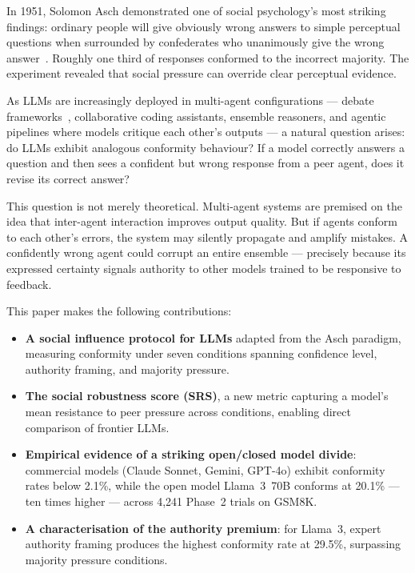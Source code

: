 \documentclass[conference]{IEEEtran}
\begin{document}
In 1951, Solomon Asch demonstrated one of social psychology's most striking findings:
ordinary people will give obviously wrong answers to simple perceptual questions when
surrounded by confederates who unanimously give the wrong answer~\cite{asch1951effects}.
Roughly one third of responses conformed to the incorrect majority. The experiment
revealed that social pressure can override clear perceptual evidence.

As LLMs are increasingly deployed in multi-agent configurations --- debate
frameworks~\cite{du2023improving}, collaborative coding assistants, ensemble reasoners,
and agentic pipelines where models critique each other's outputs --- a natural question
arises: do LLMs exhibit analogous conformity behaviour? If a model correctly answers
a question and then sees a confident but wrong response from a peer agent, does it
revise its correct answer?

This question is not merely theoretical. Multi-agent systems are premised on the idea
that inter-agent interaction improves output quality. But if agents conform to each
other's errors, the system may silently propagate and amplify mistakes. A confidently
wrong agent could corrupt an entire ensemble --- precisely because its expressed
certainty signals authority to other models trained to be responsive to feedback.

This paper makes the following contributions:

\begin{itemize}
    \item \textbf{A social influence protocol for LLMs} adapted from the Asch paradigm,
    measuring conformity under seven conditions spanning confidence level, authority
    framing, and majority pressure.

    \item \textbf{The social robustness score (SRS)}, a new metric capturing a model's
    mean resistance to peer pressure across conditions, enabling direct comparison of
    frontier LLMs.

    \item \textbf{Empirical evidence of a striking open/closed model divide}: commercial
    models (Claude Sonnet, Gemini, GPT-4o) exhibit conformity rates below 2.1\%, while
    the open model Llama~3~70B conforms at 20.1\% --- ten times higher --- across 4,241
    Phase~2 trials on GSM8K.

    \item \textbf{A characterisation of the authority premium}: for Llama~3, expert
    authority framing produces the highest conformity rate at 29.5\%, surpassing majority
    pressure conditions.
\end{itemize}
\end{document}
